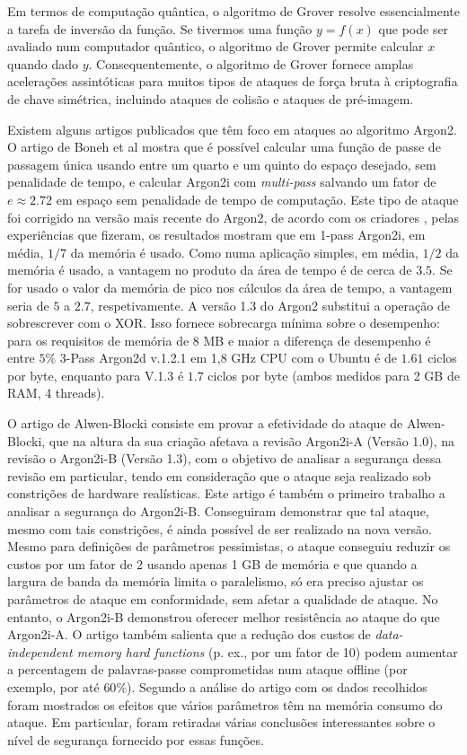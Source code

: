 \documentclass[conference]{IEEEtran}
\begin{document}
Em termos de computação quântica, o algoritmo de Grover resolve essencialmente a tarefa de 
inversão da função. Se tivermos uma função $y = f(x)$ que pode ser avaliado num computador quântico, o algoritmo de 
Grover permite calcular $x$ quando dado $y$. Consequentemente, o algoritmo de Grover fornece amplas acelerações 
assintóticas para muitos tipos de ataques de força bruta à criptografia de chave simétrica, incluindo ataques 
de colisão e ataques de pré-imagem. \cite{bernstein2009post}

Existem alguns artigos publicados que têm foco em ataques ao algoritmo Argon2. 
O artigo de Boneh et al \cite{boneh2016balloon} mostra que é possível calcular uma função de passe 
de passagem única usando entre um quarto e um quinto do espaço desejado, sem penalidade 
de tempo, e calcular Argon2i com \textit{multi-pass} salvando um fator de $e \approx 2.72$ 
em espaço sem penalidade de tempo de computação. Este tipo de ataque foi corrigido na 
versão mais recente do Argon2, de acordo com os criadores \cite{argon2spec}, 
pelas experiências que fizeram, os resultados mostram que em 1-pass Argon2i, em média, $1/7$ 
da memória é usado. Como numa aplicação simples, em média, $1/2$ da memória é usado, 
a vantagem no produto da área de tempo é de cerca de $3.5$. Se for usado o valor da 
memória de pico nos cálculos da área de tempo, a vantagem seria de $5$ a $2.7$, respetivamente. 
A versão 1.3 do Argon2 substitui a operação de sobrescrever com o XOR. Isso fornece 
sobrecarga mínima sobre o desempenho: para os requisitos de memória de 8 MB e 
maior a diferença de desempenho é entre $5\%$ 3-Pass Argon2d v.1.2.1 em 1,8 GHz CPU 
com o Ubuntu é de $1.61$ ciclos por byte, enquanto para V.1.3 é $1.7$ ciclos por byte 
(ambos medidos para 2 GB de RAM, 4 threads). 

O artigo de Alwen-Blocki \cite{alwen2017towards} consiste em provar a efetividade do ataque de Alwen-Blocki, 
que na altura da sua criação afetava a revisão Argon2i-A (Versão 1.0), na revisão 
o Argon2i-B (Versão 1.3), com o objetivo de analisar a segurança dessa revisão em particular, 
tendo em consideração que o ataque seja realizado sob constrições de hardware realísticas. Este 
artigo é também o primeiro trabalho a analisar a segurança do Argon2i-B.
Conseguiram demonstrar que tal ataque, mesmo com tais constrições, é ainda possível de ser 
realizado na nova versão. Mesmo para definições de parâmetros pessimistas, o ataque 
conseguiu reduzir os custos por um fator de 2 usando apenas 1 GB de memória e que 
quando a largura de banda da memória limita o paralelismo, só era preciso ajustar 
os parâmetros de ataque em conformidade, sem afetar a qualidade de ataque. No entanto, 
o Argon2i-B demonstrou oferecer melhor resistência ao ataque do que Argon2i-A. 
O artigo também salienta que a redução dos custos de \textit{data-independent memory hard functions} (p. ex., por um fator de 10) podem 
aumentar a percentagem de palavras-passe comprometidas num ataque offline (por exemplo, por 
até $60\%$). Segundo a análise do artigo com os dados recolhidos foram mostrados os efeitos que vários 
parâmetros têm na memória consumo do ataque. Em particular, foram retiradas várias conclusões 
interessantes sobre o nível de segurança fornecido por essas funções.
\end{document}
